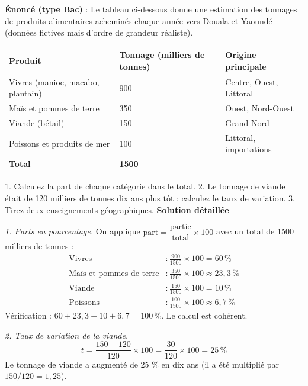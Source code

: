 \documentclass[11pt]{article}
\begin{document}
\begin{exoresolu}
\textbf{Énoncé (type Bac)} : Le tableau ci-dessous donne une estimation des tonnages de produits alimentaires acheminés chaque année vers Douala et Yaoundé (données fictives mais d'ordre de grandeur réaliste).

\begin{center}
\begin{tabularx}{\linewidth}{|l|X|X|}\hline
\rowcolor{popblueL} \textbf{Produit} & \textbf{Tonnage (milliers de tonnes)} & \textbf{Origine principale} \\ \hline
Vivres (manioc, macabo, plantain) & 900 & Centre, Ouest, Littoral \\ \hline
Maïs et pommes de terre & 350 & Ouest, Nord-Ouest \\ \hline
Viande (bétail) & 150 & Grand Nord \\ \hline
Poissons et produits de mer & 100 & Littoral, importations \\ \hline
\textbf{Total} & \textbf{1500} & \\ \hline
\end{tabularx}
\end{center}

1. Calculez la part de chaque catégorie dans le total. 2. Le tonnage de viande était de 120 milliers de tonnes dix ans plus tôt : calculez le taux de variation. 3. Tirez deux enseignements géographiques.
\tcblower
\textbf{Solution détaillée}

\emph{1. Parts en pourcentage.} On applique $\text{part} = \dfrac{\text{partie}}{\text{total}} \times 100$ avec un total de \num{1500} milliers de tonnes :
\begin{align*}
\text{Vivres} &: \frac{900}{1500} \times 100 = 60\,\% \\
\text{Maïs et pommes de terre} &: \frac{350}{1500} \times 100 \approx 23{,}3\,\% \\
\text{Viande} &: \frac{150}{1500} \times 100 = 10\,\% \\
\text{Poissons} &: \frac{100}{1500} \times 100 \approx 6{,}7\,\%
\end{align*}
Vérification : $60 + 23{,}3 + 10 + 6{,}7 = 100\,\%$. Le calcul est cohérent.

\emph{2. Taux de variation de la viande.}
\[ t = \frac{150 - 120}{120} \times 100 = \frac{30}{120} \times 100 = 25\,\% \]
Le tonnage de viande a augmenté de 25 \% en dix ans (il a été multiplié par $150/120 = 1{,}25$).


\end{exoresolu}
\end{document}
